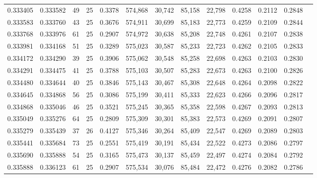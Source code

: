 \begin{tabular}{rrrrrrrrrrrrr}
0.333405 & 0.333582 &    49 &  25 &                                     0.3378 & 574,868 &  30,742 &  85,158 &  22,798 & 0.4258 & 0.2112 & 0.2848 \\
0.333583 & 0.333760 &    43 &  25 &                                     0.3676 & 574,911 &  30,699 &  85,183 &  22,773 & 0.4259 & 0.2109 & 0.2844 \\
0.333768 & 0.333976 &    61 &  25 &                                     0.2907 & 574,972 &  30,638 &  85,208 &  22,748 & 0.4261 & 0.2107 & 0.2838 \\
0.333981 & 0.334168 &    51 &  25 &                                     0.3289 & 575,023 &  30,587 &  85,233 &  22,723 & 0.4262 & 0.2105 & 0.2833 \\
0.334172 & 0.334290 &    39 &  25 &                                     0.3906 & 575,062 &  30,548 &  85,258 &  22,698 & 0.4263 & 0.2103 & 0.2830 \\
0.334291 & 0.334475 &    41 &  25 &                                     0.3788 & 575,103 &  30,507 &  85,283 &  22,673 & 0.4263 & 0.2100 & 0.2826 \\
0.334480 & 0.334644 &    40 &  25 &                                     0.3846 & 575,143 &  30,467 &  85,308 &  22,648 & 0.4264 & 0.2098 & 0.2822 \\
0.334645 & 0.334868 &    56 &  25 &                                     0.3086 & 575,199 &  30,411 &  85,333 &  22,623 & 0.4266 & 0.2096 & 0.2817 \\
0.334868 & 0.335046 &    46 &  25 &                                     0.3521 & 575,245 &  30,365 &  85,358 &  22,598 & 0.4267 & 0.2093 & 0.2813 \\
0.335049 & 0.335276 &    64 &  25 &                                     0.2809 & 575,309 &  30,301 &  85,383 &  22,573 & 0.4269 & 0.2091 & 0.2807 \\
0.335279 & 0.335439 &    37 &  26 &                                     0.4127 & 575,346 &  30,264 &  85,409 &  22,547 & 0.4269 & 0.2089 & 0.2803 \\
0.335441 & 0.335684 &    73 &  25 &                                     0.2551 & 575,419 &  30,191 &  85,434 &  22,522 & 0.4273 & 0.2086 & 0.2797 \\
0.335690 & 0.335888 &    54 &  25 &                                     0.3165 & 575,473 &  30,137 &  85,459 &  22,497 & 0.4274 & 0.2084 & 0.2792 \\
0.335888 & 0.336123 &    61 &  25 &                                     0.2907 & 575,534 &  30,076 &  85,484 &  22,472 & 0.4276 & 0.2082 & 0.2786 \\

\end{tabular}
